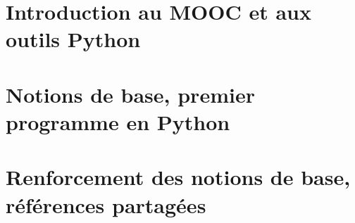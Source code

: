 \documentclass[11pt, a4paper, french
]{book}
\begin{document}
\pagestyle{empty}
\tableofcontents
\thispagestyle{empty}   



    \chapter{Introduction au MOOC et aux outils Python}
    \pagestyle{plain}
    \setcounter{page}{1}    
	
    
    
    
    
    
    
    
    
    
    
    
    
    
    
    
    
    
    

    \chapter{Notions de base, premier programme en Python}

       
    
    
       
    
    
    
    
    
    
    
    
    
    
    
    
    
    
    
    
    
    
    \chapter{Renforcement des notions de base, références partagées}
\end{document}

